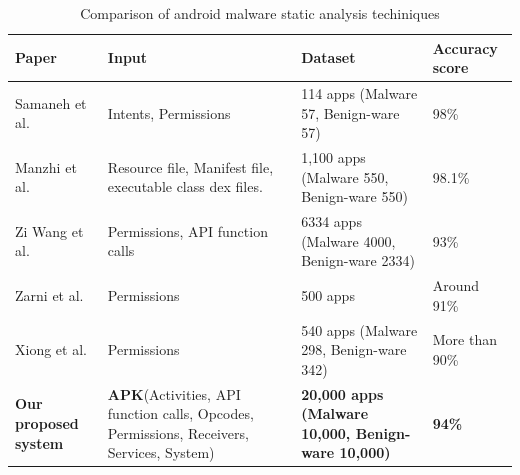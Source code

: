 \begin{table}[htbp]
    \centering
    \caption{Comparison of android malware static analysis techiniques}
    \label{table:comparison}
    \begin{adjustbox}{width=\textwidth}
    \begin{tabular}{|l|m{40mm}|m{40mm}|l|}
        \hline
        
        Paper & Input & Dataset & Accuracy score \\ \hline
        Samaneh et al. \cite{samaneh}& Intents, Permissions & 114 apps (Malware 57, Benign-ware 57) & 98\% \\ \hline
        Manzhi et al.\cite{manzhi} & Resource file, Manifest file, executable class dex files. & 1,100 apps (Malware 550, Benign-ware 550) & 98.1\% \\ \hline
        Zi Wang et al.\cite{ziwang} & Permissions, API function calls & 6334 apps (Malware 4000, Benign-ware 2334) & 93\% \\ \hline
        Zarni et al.\cite{zarni} & Permissions & 500 apps & Around 91\% \\ \hline
        Xiong et al.\cite{xiong} & Permissions & 540 apps (Malware 298, Benign-ware 342) & More than 90\% \\ \hline
        \textbf{Our proposed system} & \textbf{APK}(Activities, API function calls, Opcodes, Permissions, Receivers, Services, System) & \textbf{20,000 apps (Malware 10,000, Benign-ware 10,000)} & \textbf{94\%} \\ \hline
        
        \end{tabular}
    \end{adjustbox}
    \end{table}

